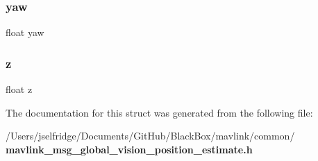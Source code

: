 \subsubsection{yaw}
{\footnotesize\ttfamily float yaw}

\mbox{\label{struct____mavlink__global__vision__position__estimate__t_af73583b1e980b0aa03f9884812e9fd4d}} 
\subsubsection{z}
{\footnotesize\ttfamily float z}



The documentation for this struct was generated from the following file\+:\begin{DoxyCompactItemize}
\item 
/\+Users/jselfridge/\+Documents/\+Git\+Hub/\+Black\+Box/mavlink/common/\textbf{ mavlink\+\_\+msg\+\_\+global\+\_\+vision\+\_\+position\+\_\+estimate.\+h}\end{DoxyCompactItemize}
